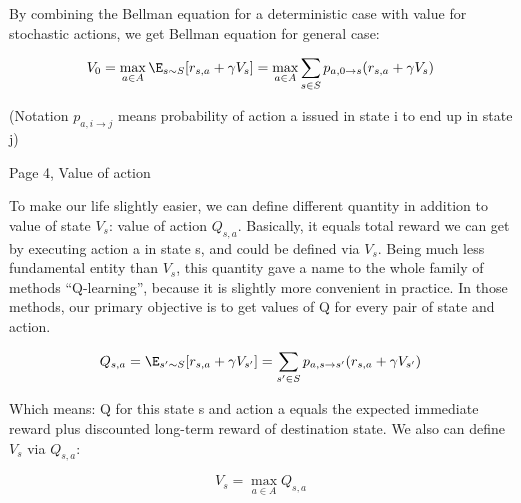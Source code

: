 By combining the Bellman
equation for a deterministic case with value for stochastic actions, we get
Bellman equation for general case:

\begin{equation*}
V_0 = \max_{a \in A}\E_{s \sim S}[r_{s,a} + \gamma V_s] = \max_{a \in A} \sum_{s \in S}
p_{a,0 \rightarrow s}(r_{s,a} + \gamma V_s)
\end{equation*}

(Notation \begin{math}p_{a,i \rightarrow j}\end{math} means probability of action a issued in
state i to end up in state j)



Page 4, Value of action

To make our life slightly easier, we can define different quantity in addition
to value of state \begin{math}V_s\end{math}: value of action \begin{math}Q_{s,a}\end{math}. Basically, it equals total
reward we can get by executing action a in state s, and could be defined via
\begin{math}V_s\end{math}. Being much less fundamental entity than \begin{math}V_s\end{math}, this quantity gave a name to
the whole family of methods “Q-learning”, because it is slightly more convenient
in practice. In those methods, our primary objective is to get values of Q for
every pair of state and action.

\begin{equation*}
  Q_{s,a} = \E_{s' \sim S}[r_{s,a} + \gamma V_{s'}] =
  \sum_{s' \in S} p_{a,s \rightarrow s'}(r_{s,a} + \gamma V_{s'})
\end{equation*}

Which means: Q for this state s and action a equals the expected immediate
reward plus discounted long-term reward of destination state. We also can define
\begin{math}V_s\end{math} via \begin{math}Q_{s, a}\end{math}:

\begin{equation*}
  V_s = \max_{a \in A} Q_{s,a}
\end{equation*}

